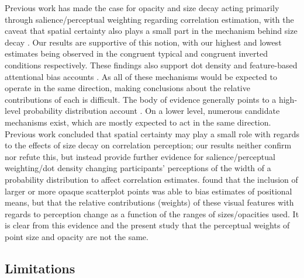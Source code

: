 \documentclass[manuscript, review, anonymous, screen]{acmart}
\begin{document}
Previous work has made the case for opacity and size decay acting
primarily through salience/perceptual weighting regarding correlation
estimation, with the caveat that spatial certainty also plays a small
part in the mechanism behind size decay
\citep{strain_2023, strain_2023b}. Our results are supportive of this
notion, with our highest and lowest estimates being observed in the
congruent typical and congruent inverted conditions respectively. These
findings also support dot density \citep{yang_2023} and feature-based
attentional bias accounts \citep{hong_2021, sun_2016}. As all of these
mechanisms would be expected to operate in the same direction, making
conclusions about the relative contributions of each is difficult. The
body of evidence generally points to a high-level probability
distribution account \citep{rensink_2017, rensink_2022}. On a lower
level, numerous candidate mechanisms exist, which are mostly expected to
act in the same direction. Previous work concluded that spatial
certainty \citep{strain_2023b} may play a small role with regards to the
effects of size decay on correlation perception; our results neither
confirm nor refute this, but instead provide further evidence for
salience/perceptual weighting/dot density changing participants'
perceptions of the width of a probability distribution to affect
correlation estimates. \citep{hong_2021} found that the inclusion of
larger or more opaque scatterplot points was able to bias estimates of
positional means, but that the relative contributions (weights) of these
visual features with regards to perception change as a function of the
ranges of sizes/opacities used. It is clear from this evidence and the
present study that the perceptual weights of point size and opacity are
not the same.

\hypertarget{sec-limitations}{%
\subsection{Limitations}\label{sec-limitations}}
\end{document}
